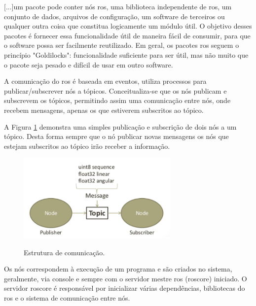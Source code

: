 \begin{quoting}[rightmargin=0cm,leftmargin=4cm]
	\begin{singlespace}
		{\footnotesize
			[...]um pacote pode conter nós \gls*{ros}, uma biblioteca independente de \gls*{ros}, um conjunto de dados, arquivos de configuração, um software de terceiros ou qualquer outra coisa que constitua logicamente um módulo útil. O objetivo desses pacotes é fornecer essa funcionalidade útil de maneira fácil de consumir, para que o software possa ser facilmente reutilizado. Em geral, os pacotes \gls*{ros} seguem o princípio "Goldilocks": funcionalidade suficiente para ser útil, mas não muito que o pacote seja pesado e difícil de usar em outro software. \cite[tradução nossa]{rospackages}
		}
	\end{singlespace}
\end{quoting}


A comunicação do \gls*{ros} é baseada em eventos, utiliza processos para publicar/subscrever nós a tópicos. Conceitualiza-se que os nós publicam e subscrevem os tópicos, permitindo assim uma comunicação entre nós, onde recebem mensagens, apenas os que estiverem subscritos ao tópico.

A Figura \ref{fig:estrutura_comunicacao_ros} demonstra uma simples publicação e subscrição de dois nós a um tópico. Desta forma sempre que o nó publicar novas mensagens os nós que estejam subscritos ao tópico irão receber a informação.

\begin{figure}[H]
	\centering
	\caption{Estrutura de comunicação.}
	\includegraphics[width=0.7\textwidth]
	{Figures/estrutura_comunicacao_ros}
	\label{fig:estrutura_comunicacao_ros}
\end{figure}

Os nós correspondem à execução de um programa e são criados no sistema, geralmente, via console e sempre com o servidor mestre \gls*{ros} (roscore) iniciado. O servidor roscore é responsável por inicializar várias dependências, bibliotecas do \gls*{ros} e o sistema de comunicação entre nós.
